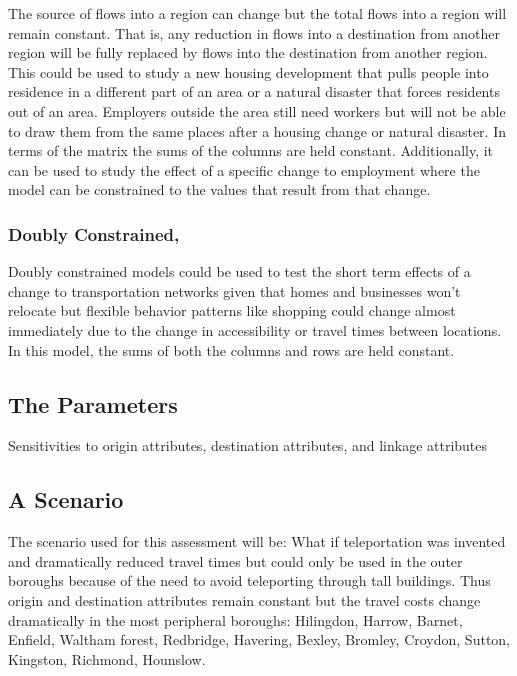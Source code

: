 \documentclass[11pt]{article} %
\begin{document}
The source of flows into a region can change but the total flows into a region will remain constant. That is, any reduction in flows into a destination from another region will be fully replaced by flows into the destination from another region.  This could be used to study a new housing development that pulls people into residence in a different part of an area or a natural disaster that forces residents out of an area. Employers outside the area still need workers but will not be able to draw them from the same places after a housing change or natural disaster. In terms of the matrix the sums of the columns are held constant. Additionally, it can be used to study the effect of a specific change to employment where the model can be constrained to the values that result from that change. 

\subsubsection{Doubly Constrained,}

Doubly constrained models could be used to test the short term effects of a change to transportation networks given that homes and businesses won't relocate but flexible behavior patterns like shopping could change almost immediately due to the change in accessibility or travel times between locations. In this model, the sums of both the columns and rows are held constant.

\subsection{The Parameters}



Sensitivities to origin attributes, destination attributes, and linkage attributes

\subsection{A Scenario}

The scenario used for this assessment will be: What if teleportation was invented and dramatically reduced travel times but could only be used in the outer boroughs because of the need to avoid teleporting through tall buildings. Thus origin and destination attributes remain constant but the travel costs change dramatically in the most peripheral boroughs: Hilingdon, Harrow, Barnet, Enfield, Waltham forest, Redbridge, Havering, Bexley, Bromley, Croydon, Sutton, Kingston, Richmond, Hounslow. 
\end{document}
